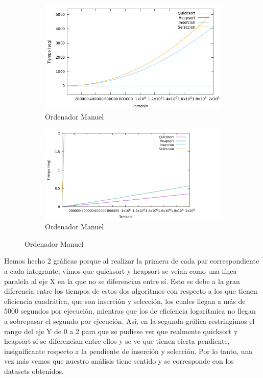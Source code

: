 \documentclass[10pt,a4paper]{article}
\begin{document}
\begin{figure}[h!]
	\begin{subfigure}{.5\textwidth}
		\centering
		\includegraphics[scale=0.35]{../../Images/Gráfica comparativa algoritmos ordenación ManuelMoya.png}
		\caption{Ordenador Manuel}
	\end{subfigure}
	\hfill
	\begin{subfigure}{.5\textwidth}
		\centering
		\includegraphics[scale=0.15]{../../Images/Gráfica comparativa algoritmos ordenación ManuelMoya (H y Q).png}
		\caption{Ordenador Manuel}
	\end{subfigure}
\end{figure}

Hemos hecho 2 gráficas porque al realizar la primera de cada par correspondiente a cada integrante, vimos que quicksort y heapsort se veían como una línea paralela al eje X en la que no se diferencian entre sí. Esto se debe a la gran diferencia entre los tiempos de estos dos algoritmos con respecto a los que tienen eficiencia cuadrática, que son inserción y selección, los cuales llegan a más de 5000 segundos por ejecución, mientras que los de eficiencia logarítmica no llegan a sobrepasar el segundo por ejecución. Así, en la segunda gráfica restringimos el rango del eje Y de 0 a 2 para que se pudiese ver que realmente quicksort y heapsort sí se diferencian entre ellos y se ve que tienen cierta pendiente, insignificante respecto a la pendiente de inserción y selección. Por lo tanto, una vez más vemos que nuestro análisis tiene sentido y se corresponde con los datasets obtenidos.
\end{document}
